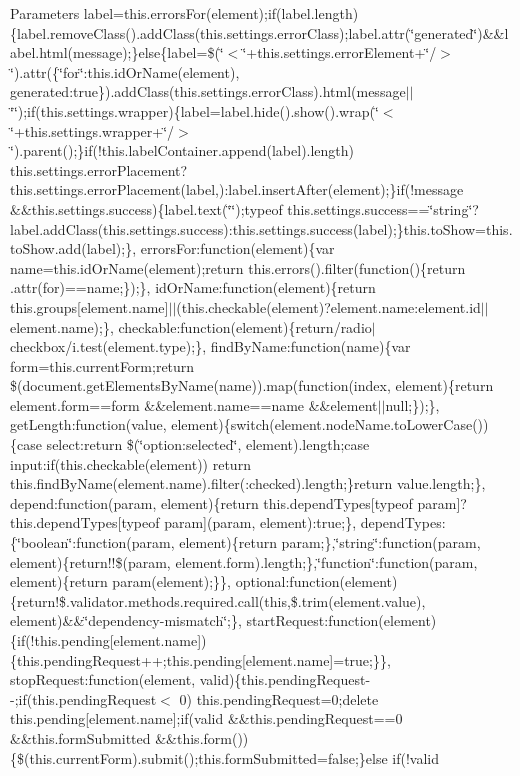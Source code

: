 \begin{DoxyParams}{Parameters}
label=this.\+errors\+For(element);if(label.\+length)\{label.\+remove\+Class().add\+Class(this.\+settings.\+error\+Class);label.\+attr(\char`\"{}generated\char`\"{})\&\&label.\+html(message);\}else\{label=\$(\char`\"{}$<$\char`\"{}+this.settings.\+error\+Element+\char`\"{}/$>$\char`\"{}).attr(\{\char`\"{}for\char`\"{}\+:this.\+id\+Or\+Name(element), generated\+:true\}).add\+Class(this.\+settings.\+error\+Class).html(message$\vert$$\vert$\char`\"{}\char`\"{});if(this.\+settings.\+wrapper)\{label=label.\+hide().show().wrap(\char`\"{}$<$\char`\"{}+this.settings.\+wrapper+\char`\"{}/$>$\char`\"{}).parent();\}if(!this.label\+Container.\+append(label).length) this.\+settings.\+error\+Placement?this.\+settings.\+error\+Placement(label,)\+:label.\+insert\+After(element);\}if(!message \&\&this.\+settings.\+success)\{label.\+text(\char`\"{}\char`\"{});typeof this.\+settings.\+success==\char`\"{}string\char`\"{}?label.\+add\+Class(this.\+settings.\+success)\+:this.\+settings.\+success(label);\}this.\+to\+Show=this.\+to\+Show.\+add(label);\}, errors\+For\+:function(element)\{var name=this.\+id\+Or\+Name(element);return this.\+errors().filter(function()\{return .attr(\textquotesingle{}for\textquotesingle{})==name;\});\}, id\+Or\+Name\+:function(element)\{return this.\+groups\mbox{[}element.\+name\mbox{]}$\vert$$\vert$(this.\+checkable(element)?element.\+name\+:element.\+id$\vert$$\vert$element.name);\}, checkable\+:function(element)\{return/radio$\vert$checkbox/i.test(element.\+type);\}, find\+By\+Name\+:function(name)\{var form=this.\+current\+Form;return \$(document.\+get\+Elements\+By\+Name(name)).map(function(index, element)\{return element.\+form==form \&\&element.\+name==name \&\&element$\vert$$\vert$null;\});\}, get\+Length\+:function(value, element)\{switch(element.\+node\+Name.\+to\+Lower\+Case())\{case \textquotesingle{}select\textquotesingle{}\+:return \$(\char`\"{}option\+:selected\char`\"{}, element).length;case \textquotesingle{}input\textquotesingle{}\+:if(this.\+checkable(element)) return this.\+find\+By\+Name(element.\+name).filter(\textquotesingle{}\+:checked\textquotesingle{}).length;\}return value.\+length;\}, depend\+:function(param, element)\{return this.\+depend\+Types\mbox{[}typeof param\mbox{]}?this.\+depend\+Types\mbox{[}typeof param\mbox{]}(param, element)\+:true;\}, depend\+Types\+:\{\char`\"{}boolean\char`\"{}\+:function(param, element)\{return param;\},\char`\"{}string\char`\"{}\+:function(param, element)\{return!!\$(param, element.\+form).length;\},\char`\"{}function\char`\"{}\+:function(param, element)\{return param(element);\}\}, optional\+:function(element)\{return!\$.validator.\+methods.\+required.\+call(this,\$.trim(element.\+value), element)\&\&\char`\"{}dependency-\/mismatch\char`\"{};\}, start\+Request\+:function(element)\{if(!this.pending\mbox{[}element.\+name\mbox{]})\{this.\+pending\+Request++;this.\+pending\mbox{[}element.\+name\mbox{]}=true;\}\}, stop\+Request\+:function(element, valid)\{this.\+pending\+Request-\/-\/;if(this.\+pending\+Request$<$ 0) this.\+pending\+Request=0;delete this.\+pending\mbox{[}element.\+name\mbox{]};if(valid \&\&this.\+pending\+Request==0 \&\&this.\+form\+Submitted \&\&this.\+form())\{\$(this.\+current\+Form).submit();this.\+form\+Submitted=false;\}else if(!valid 
\end{DoxyParams}
